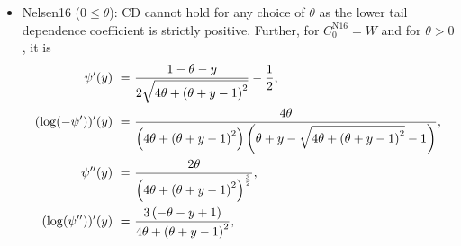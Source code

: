 \documentclass{article}
\def\of#1{\left(#1\right)} %
\begin{document}
\begin{itemize}
\begin{align*}
        \psi'(y) ~=~ & - y^{- \frac{\theta - 1}{\theta}} \left(1 - y^{\frac1{\theta}}\right)^{\theta - 1}, \\
        (\log(-\psi'))'(y) ~=~ & \frac{\theta - 1}{\theta y \left(y^{\frac1{\theta}} - 1\right)}, \\
        (\log(-\psi'))''(y) ~=~ & \frac{- \theta^2 y^{\frac1{\theta}} + \theta^2 - \theta + y^{\frac1{\theta}}}{\theta^2 y^2 \left(y^{\frac2{\theta}} - 2 y^{\frac1{\theta}} + 1\right)}
    .\end{align*}
    Substituting $z=y^{1/\theta}$, it is immediate that the denominator cannot become negative, and the numerator reads as $\theta^2(1-z) + z - \theta$, which for $\theta>1$ becomes negative as $y\rightarrow 1$, and positive as $y\rightarrow 0$.
    Consequently, this copula family is neither CI nor CD in this case.
    At $\theta=1$, it is $C^{\text{GG}}_1=W$, which is CD.
    \item Nelsen16 ($0 \leq \theta$):
    CD cannot hold for any choice of $\theta$ as the lower tail dependence coefficient is strictly positive.
    Further, for $C^{\text{N16}}_{0} = W$ and for $\theta > 0$, it is
    \begin{align}
        \psi'(y) ~=~ & \frac{1- \theta - y}{2 \sqrt{4 \theta + \left(\theta + y - 1\right)^{2}}} - \frac12 , \nonumber\allowdisplaybreaks\\
        (\log(-\psi'))'(y) ~=~ & \frac{4 \theta}{\left(4 \theta + \left(\theta + y - 1\right)^2\right) \left(\theta + y - \sqrt{4 \theta + \left(\theta + y - 1\right)^{2}} - 1\right)}, \label{frm:n16_ci_2} \\
        \psi''(y) ~=~ & \frac{2 \theta}{\left(4 \theta + \left(\theta + y - 1\right)^{2}\right)^{\frac{3}{2}}}, \nonumber\allowdisplaybreaks\\
        (\log(\psi''))'(y) ~=~ & \frac{3 \left(- \theta - y + 1\right)}{4 \theta + \left(\theta + y - 1\right)^{2}}, \nonumber \\

\end{align}
\end{itemize}
\end{document}
